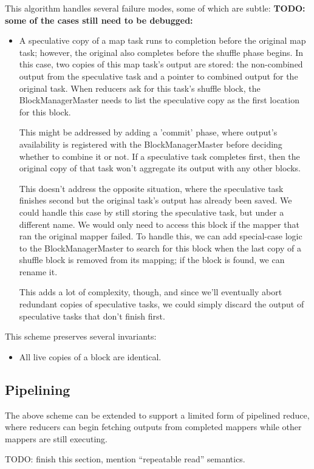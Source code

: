 \documentclass[12pt]{article}
\begin{document}
This algorithm handles several failure modes, some of which are subtle:
\textbf{TODO: some of the cases still need to be debugged:}

\begin{itemize}
   \item A speculative copy of a map task runs to completion
before the original map task; however, the original also completes before the
shuffle phase begins.  In this case, two copies of this map task's output are
stored: the non-combined output from the speculative task and a pointer to
combined output for the original task.  When reducers ask for this task's
shuffle block, the BlockManagerMaster needs to list the speculative copy as the
first location for this block.

This might be addressed by adding a 'commit' phase, where output's
availability is registered with the BlockManagerMaster before deciding whether
to combine it or not.  If a speculative task completes first, then the
original copy of that task won't aggregate its output with any other blocks.

This doesn't address the opposite situation, where the speculative task
finishes second but the original task's output has already been saved.  We
could handle this case by still storing the speculative task, but under
a different name.  We would only need to access this block if the mapper that
ran the original mapper failed.  To handle this, we can add special-case logic
to the BlockManagerMaster to search for this block when the last copy of
a shuffle block is removed from its mapping; if the block is found, we can
rename it.

This adds a lot of complexity, though, and since we'll eventually abort
redundant copies of speculative tasks, we could simply discard the output of
speculative tasks that don't finish first.
\end{itemize}

This scheme preserves several invariants:

\begin{itemize}
   \item All live copies of a block are identical.
\end{itemize}

\subsection{Pipelining}

The above scheme can be extended to support a limited form of pipelined
reduce, where reducers can begin fetching outputs from completed mappers while
other mappers are still executing.

TODO: finish this section, mention ``repeatable read'' semantics.





\end{document}
